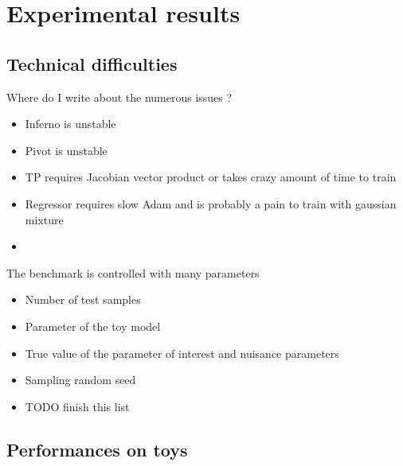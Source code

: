 
\chapter{Experimental results}
\label{chap:xp}
\ifpdf
    \graphicspath{{Chapter5/Figs/Raster/}{Chapter5/Figs/PDF/}{Chapter5/Figs/}}
\else
    \graphicspath{{Chapter5/Figs/Vector/}{Chapter5/Figs/}}
\fi




\section{Technical difficulties} %
\label{sec:technical_difficulties}

Where do I write about the numerous issues ?
\begin{itemize}
  \item Inferno is unstable
  \item Pivot is unstable
  \item TP requires Jacobian vector product or takes crazy amount of time to train
  \item Regressor requires slow Adam and is probably a pain to train with gaussian mixture
  \item
\end{itemize}



The benchmark is controlled with many parameters
\begin{itemize}
  \item Number of test samples
  \item Parameter of the toy model
  \item True value of the parameter of interest and nuisance parameters
  \item Sampling random seed
  \item TODO finish this list
\end{itemize}








\section{Performances on toys} %
\label{sec:performances_on_toys}

